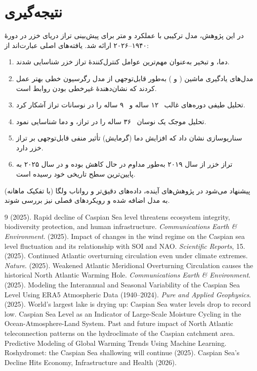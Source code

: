 \documentclass[12pt,a4paper]{article}
\begin{document}
\section{نتیجه‌گیری}
در این پژوهش، مدل ترکیبی  با عملکرد  و  متر برای پیش‌بینی تراز دریای خزر در دورهٔ ۱۹۴۰–۲۰۲۶ ارائه شد. یافته‌های اصلی عبارت‌اند از:

\begin{enumerate}
\item دما،  و تبخیر به‌عنوان مهم‌ترین عوامل کنترل‌کنندهٔ تراز خزر شناسایی شدند.
\item مدل‌های یادگیری ماشین ( و ) به‌طور قابل‌توجهی از مدل رگرسیون خطی بهتر عمل کردند که نشان‌دهندهٔ غیرخطی بودن روابط است.
\item تحلیل طیفی دوره‌های غالب ~۱۲ ساله و ~۹ ساله را در نوسانات تراز آشکار کرد.
\item تحلیل موجک یک نوسان ~۳۶ ساله را در تراز،  و دما شناسایی نمود.
\item سناریوسازی نشان داد که افزایش دما (گرمایش) تأثیر منفی قابل‌توجهی بر تراز خزر دارد.
\item تراز خزر از سال ۲۰۱۹ به‌طور مداوم در حال کاهش بوده و در سال ۲۰۲۵ به پایین‌ترین سطح تاریخی خود رسیده است.
\end{enumerate}

پیشنهاد می‌شود در پژوهش‌های آینده، داده‌های دقیق‌تر  و رواناب ولگا (با تفکیک ماهانه) به مدل اضافه شده و رویکردهای فصلی نیز بررسی شوند.

\begin{thebibliography}{9}
 (2025). Rapid decline of Caspian Sea level threatens ecosystem integrity, biodiversity protection, and human infrastructure. \emph{Communications Earth \& Environment}. 
 (2025). Impact of changes in the wind regime on the Caspian sea level fluctuation and its relationship with SOI and NAO. \emph{Scientific Reports}, 15. 
 (2025). Continued Atlantic overturning circulation even under climate extremes. \emph{Nature}. 
 (2025). Weakened Atlantic Meridional Overturning Circulation causes the historical North Atlantic Warming Hole. \emph{Communications Earth \& Environment}. 
 (2025). Modeling the Interannual and Seasonal Variability of the Caspian Sea Level Using ERA5 Atmospheric Data (1940–2024). \emph{Pure and Applied Geophysics}. 
 (2025). World’s largest lake is drying up: Caspian Sea water levels drop to record low. 
 Caspian Sea Level as an Indicator of Large-Scale Moisture Cycling in the Ocean-Atmosphere-Land System. 
 Past and future impact of North Atlantic teleconnection patterns on the hydroclimate of the Caspian catchment area. 
 Predictive Modeling of Global Warming Trends Using Machine Learning. 
 Roshydromet: the Caspian Sea shallowing will continue (2025). 
 Caspian Sea’s Decline Hits Economy, Infrastructure and Health (2026). 
\end{thebibliography}
\end{document}
